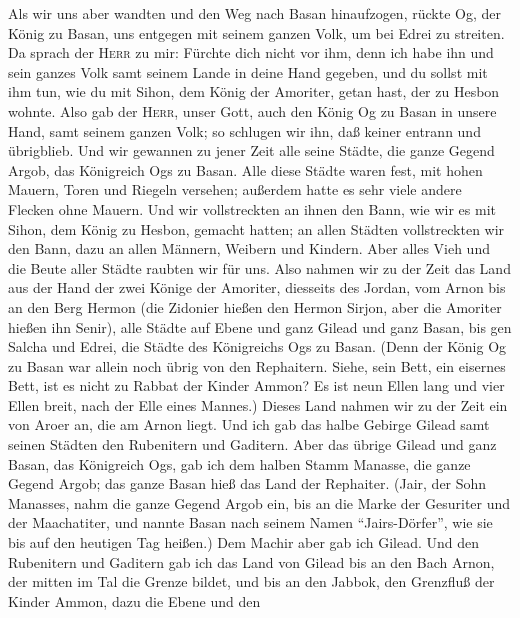  Als wir uns aber wandten und den Weg nach Basan
hinaufzogen, rückte Og, der König zu Basan, uns entgegen mit seinem
ganzen Volk, um bei Edrei zu streiten.  Da sprach der
\textsc{Herr} zu mir: Fürchte dich nicht vor ihm, denn ich habe ihn und
sein ganzes Volk samt seinem Lande in deine Hand gegeben, und du sollst
mit ihm tun, wie du mit Sihon, dem König der Amoriter, getan hast, der
zu Hesbon wohnte.  Also gab der \textsc{Herr}, unser Gott,
auch den König Og zu Basan in unsere Hand, samt seinem ganzen Volk; so
schlugen wir ihn, daß keiner entrann und übrigblieb.  Und
wir gewannen zu jener Zeit alle seine Städte, die ganze Gegend Argob,
das Königreich Ogs zu Basan.  Alle diese Städte waren
fest, mit hohen Mauern, Toren und Riegeln versehen; außerdem hatte es
sehr viele andere Flecken ohne Mauern.  Und wir
vollstreckten an ihnen den Bann, wie wir es mit Sihon, dem König zu
Hesbon, gemacht hatten; an allen Städten vollstreckten wir den Bann,
dazu an allen Männern, Weibern und Kindern.  Aber alles
Vieh und die Beute aller Städte raubten wir für uns.  Also
nahmen wir zu der Zeit das Land aus der Hand der zwei Könige der
Amoriter, diesseits des Jordan, vom Arnon bis an den Berg Hermon
 (die Zidonier hießen den Hermon Sirjon, aber die Amoriter
hießen ihn Senir),  alle Städte auf Ebene und ganz Gilead
und ganz Basan, bis gen Salcha und Edrei, die Städte des Königreichs Ogs
zu Basan.  (Denn der König Og zu Basan war allein noch
übrig von den Rephaitern. Siehe, sein Bett, ein eisernes Bett, ist es
nicht zu Rabbat der Kinder Ammon? Es ist neun Ellen lang und vier Ellen
breit, nach der Elle eines Mannes.)  Dieses Land nahmen
wir zu der Zeit ein von Aroer an, die am Arnon liegt. Und ich gab das
halbe Gebirge Gilead samt seinen Städten den Rubenitern und Gaditern.
 Aber das übrige Gilead und ganz Basan, das Königreich
Ogs, gab ich dem halben Stamm Manasse, die ganze Gegend Argob; das ganze
Basan hieß das Land der Rephaiter.  (Jair, der Sohn
Manasses, nahm die ganze Gegend Argob ein, bis an die Marke der
Gesuriter und der Maachatiter, und nannte Basan nach seinem Namen
``Jairs-Dörfer'', wie sie bis auf den heutigen Tag heißen.)
 Dem Machir aber gab ich Gilead.  Und den
Rubenitern und Gaditern gab ich das Land von Gilead bis an den Bach
Arnon, der mitten im Tal die Grenze bildet, und bis an den Jabbok, den
Grenzfluß der Kinder Ammon,  dazu die Ebene und den
